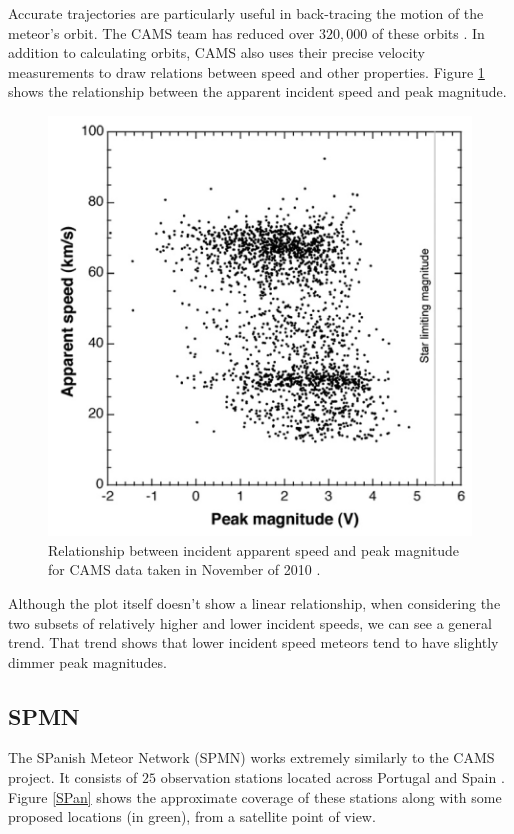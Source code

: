 Accurate trajectories are particularly useful in back-tracing the motion of the meteor's orbit.  
The CAMS team has reduced over $320,000$ of these orbits \cite{noauthor_cameras_nodate}. 
In addition to calculating orbits, CAMS also uses their precise velocity measurements to draw relations between speed and other properties. 
Figure \ref{fancyCAMS} shows the relationship between the apparent incident speed and peak magnitude.

\begin{figure}[ht!]
  \centering
  \includegraphics[scale=0.6]{images/CAMS_plot.png}
  \caption{Relationship between incident apparent speed and peak magnitude for CAMS data taken in November of 2010 \cite{jenniskens_cams:_2011}.}
  \label{fancyCAMS}
\end{figure}


Although the plot itself doesn't show a linear relationship, when considering the two subsets of relatively higher and lower incident speeds, we can see a general trend.
That trend shows that lower incident speed meteors tend to have slightly dimmer peak magnitudes. 



\subsection{SPMN}

The SPanish Meteor Network (SPMN) works extremely similarly to the CAMS project.  
It consists of $25$ observation stations located across Portugal and Spain \cite{trigo-rodriguez_2006_2007}.
Figure \ref{SPan} shows the approximate coverage of these stations along with some proposed locations (in green), from a satellite point of view.  

